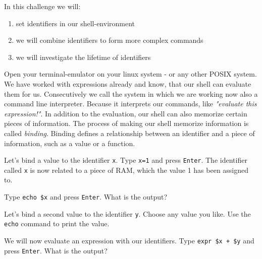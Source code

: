 \begin{challenge}
\begin{chadescription}
        In this challenge we will: 
        \begin{enumerate}
            \item set identifiers in our shell-environment
            \item we will combine identifiers to form more complex commands
            \item we will investigate the lifetime of identifiers
        \end{enumerate}
    \end{chadescription}

    \begin{task}
        Open your terminal-emulator on your linux system - or any other POSIX system.
        We have worked with expressions already and know, that our shell can evaluate them for us.
        Consecutively we call the system in which we are working now also a command line interpreter.
        Because it interprets our commands, like \textit{"evaluate this expression!"}.
        In addition to the evaluation, our shell can also memorize certain pieces of information.
        The process of making our shell memorize information is called \textit{binding}.
        Binding defines a relationship between an identifier and a piece of information, such as a value or a function.        
        \begin{questions}
            \item Let's bind a value to the identifier \texttt{x}. Type \texttt{x=1} and press \texttt{Enter}. The identifier called \texttt{x} is now related to a piece of RAM, which the value 1 has been assigned to.
            \item Type \texttt{echo \$x} and press \texttt{Enter}. What is the output?
            \item Let's bind a second value to the identifier \texttt{y}. Choose any value you like. Use the \texttt{echo} command to print the value.
            \item We will now evaluate an expression with our identifiers. Type \texttt{expr \$x + \$y} and press \texttt{Enter}. What is the output?
        \end{questions}
    \end{task}


\end{challenge}
